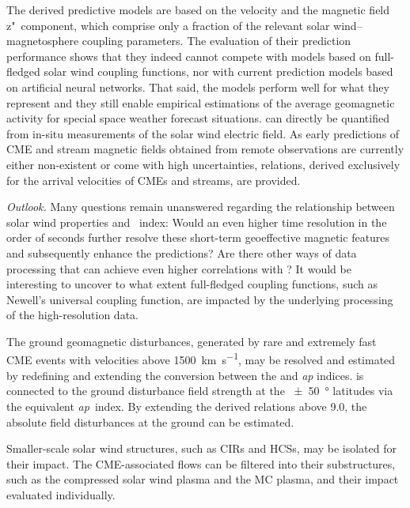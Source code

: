 The derived predictive models are based on the velocity and the magnetic field z"~component, which comprise only a fraction of the relevant solar wind--magnetosphere coupling parameters. The evaluation of their prediction performance shows that they indeed cannot compete with models based on full-fledged solar wind coupling functions, nor with current prediction models based on artificial neural networks.
That said, the models perform well for what they represent and they still enable empirical estimations of the average geomagnetic activity for special space weather forecast situations. \Kp{} can directly be quantified from in-situ measurements of the solar wind electric field. As early predictions of CME and stream magnetic fields obtained from remote observations are currently either non-existent or come with high uncertainties, \Kp{} relations, derived exclusively for the arrival velocities of CMEs and streams, are provided.

\bigskip

\noindent \textit{Outlook.}
Many questions remain unanswered regarding the relationship between solar wind properties and \Kp~index: Would an even higher time resolution in the order of seconds further resolve these short-term geoeffective magnetic features and subsequently enhance the \Kp{} predictions? Are there other ways of data processing that can achieve even higher correlations with \Kp{}?
It would be interesting to uncover to what extent full-fledged coupling functions, such as Newell's universal coupling function, are impacted by the underlying processing of the high-resolution data.

The ground geomagnetic disturbances, generated by rare and extremely fast CME events with velocities above \SI{1500}{\km\per\s}, may be resolved and estimated by redefining and extending the conversion between the \Kp{} and \textit{ap} indices. \Kp{} is connected to the ground disturbance field strength at the \SI{+-50}{\degree} latitudes via the equivalent \textit{ap}~index. By extending the derived \Kp{} relations above \num{9.0}, the absolute field disturbances at the ground can be estimated.

Smaller-scale solar wind structures, such as CIRs and HCSs, may be isolated for their \Kp{} impact. The CME-associated flows can be filtered into their substructures, such as the compressed solar wind plasma and the MC plasma, and their \Kp{} impact evaluated individually.

